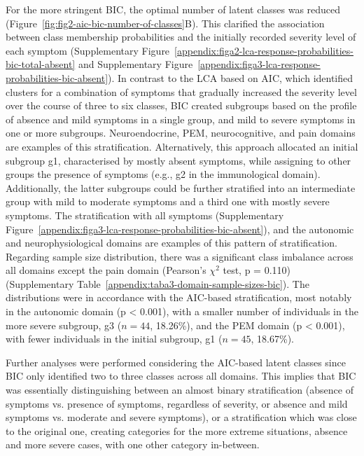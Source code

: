 \clearpage
For the more stringent BIC, the optimal number of latent classes was reduced (Figure~\ref{fig:fig2-aic-bic-number-of-classes}B).
This clarified the association between class membership probabilities and the initially recorded severity level of each symptom (Supplementary Figure~\ref{appendix:figa2-lca-response-probabilities-bic-total-absent} and Supplementary Figure~\ref{appendix:figa3-lca-response-probabilities-bic-absent}).
In contrast to the LCA based on AIC, which identified clusters for a combination of symptoms that gradually increased the severity level over the course of three to six classes, BIC created subgroups based on the profile of absence and mild symptoms in a single group, and mild to severe symptoms in one or more subgroups.
Neuroendocrine, PEM, neurocognitive, and pain domains are examples of this stratification.
Alternatively, this approach allocated an initial subgroup g1, characterised by mostly absent symptoms, while assigning to other groups the presence of symptoms (e.g., g2 in the immunological domain).
Additionally, the latter subgroups could be further stratified into an intermediate group with mild to moderate symptoms and a third one with mostly severe symptoms.
The stratification with all symptoms (Supplementary Figure~\ref{appendix:figa3-lca-response-probabilities-bic-absent}), and the autonomic and neurophysiological domains are examples of this pattern of stratification.
Regarding sample size distribution, there was a significant class imbalance across all domains except the pain domain (Pearson's $\chi^2$ test, p = 0.110) (Supplementary Table~\ref{appendix:taba3-domain-sample-sizes-bic}).
The distributions were in accordance with the AIC-based stratification, most notably in the autonomic domain (p < 0.001), with a smaller number of individuals in the more severe subgroup, g3 ($n = 44$, 18.26\%), and the PEM domain (p < 0.001), with fewer individuals in the initial subgroup, g1 ($n = 45$, 18.67\%).


Further analyses were performed considering the AIC-based latent classes since BIC only identified two to three classes across all domains.
This implies that BIC was essentially distinguishing between an almost binary stratification (absence of symptoms vs. presence of symptoms, regardless of severity, or absence and mild symptoms vs. moderate and severe symptoms), or a stratification which was close to the original one, creating categories for the more extreme situations, absence and more severe cases, with one other category in-between.


